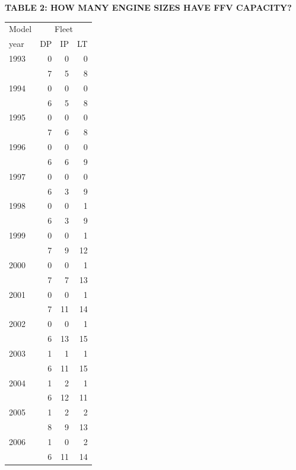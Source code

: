 \vspace{1em}
\noindent\textbf{TABLE 2: HOW MANY ENGINE SIZES HAVE FFV CAPACITY?}
\vspace{0.5em}

\begin{tabular}{lrrr}
\toprule
Model & \multicolumn{3}{c}{Fleet} \\
year & DP & IP & LT \\
\midrule
1993 & 0 & 0 & 0 \\
 & 7 & 5 & 8 \\
1994 & 0 & 0 & 0 \\
 & 6 & 5 & 8 \\
1995 & 0 & 0 & 0 \\
 & 7 & 6 & 8 \\
1996 & 0 & 0 & 0 \\
 & 6 & 6 & 9 \\
1997 & 0 & 0 & 0 \\
 & 6 & 3 & 9 \\
1998 & 0 & 0 & 1 \\
 & 6 & 3 & 9 \\
1999 & 0 & 0 & 1 \\
 & 7 & 9 & 12 \\
2000 & 0 & 0 & 1 \\
 & 7 & 7 & 13 \\
2001 & 0 & 0 & 1 \\
 & 7 & 11 & 14 \\
2002 & 0 & 0 & 1 \\
 & 6 & 13 & 15 \\
2003 & 1 & 1 & 1 \\
 & 6 & 11 & 15 \\
2004 & 1 & 2 & 1 \\
 & 6 & 12 & 11 \\
2005 & 1 & 2 & 2 \\
 & 8 & 9 & 13 \\
2006 & 1 & 0 & 2 \\
 & 6 & 11 & 14 \\
\bottomrule
\end{tabular}

